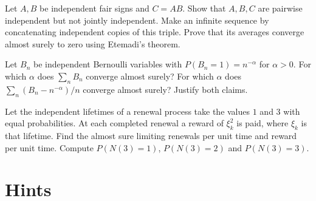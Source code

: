 \begin{exercise}[$\star\star$]\label{ex:v11-ch02-pairwise}
Let $A,B$ be independent fair signs and $C=AB$. Show that $A,B,C$ are pairwise independent but not jointly independent. Make an infinite sequence by concatenating independent copies of this triple. Prove that its averages converge almost surely to zero using Etemadi's theorem.
\end{exercise}

\begin{exercise}[$\star\star$]\label{ex:v11-ch02-three}
Let $B_n$ be independent Bernoulli variables with $P(B_n=1)=n^{-\alpha}$ for $\alpha>0$. For which $\alpha$ does $\sum_n B_n$ converge almost surely? For which $\alpha$ does $\sum_n (B_n-n^{-\alpha})/n$ converge almost surely? Justify both claims.
\end{exercise}

\begin{exercise}[$\star\star$]\label{ex:v11-ch02-renewal}
Let the independent lifetimes of a renewal process take the values $1$ and $3$ with equal probabilities. At each completed renewal a reward of $\xi_k^2$ is paid, where $\xi_k$ is that lifetime. Find the almost sure limiting renewals per unit time and reward per unit time. Compute $P(N(3)=1)$, $P(N(3)=2)$ and $P(N(3)=3)$.
\end{exercise}

\section{Hints}

